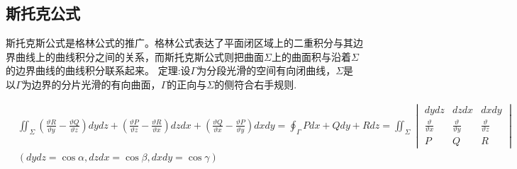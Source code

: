 \documentclass[10pt, a4paper, oneside]{ctexart}
\begin{document}
\begin{sloppypar}
	\subsection{斯托克公式}
	斯托克斯公式是格林公式的推广。格林公式表达了平面闭区域上的二重积分与其边界曲线上的曲线积分之间的关系，而斯托克斯公式则把曲面$\Sigma$上的曲面积与沿着$\Sigma$的边界曲线的曲线积分联系起来。
	定理:设$\Gamma$为分段光滑的空间有向闭曲线，$\Sigma$是以$\Gamma$为边界的分片光滑的有向曲面，$\Gamma$的正向与$\Sigma$的侧符合右手规则.

	\begin{equation}\label{斯托克公式}
		\begin{aligned}
			 & \iint_\Sigma (\frac{\vartheta R}{\vartheta y} - \frac{\vartheta Q}{\vartheta z})dydz +(\frac{\vartheta P}{\vartheta z} - \frac{\vartheta R}{\vartheta x})dzdx + (\frac{\vartheta Q}{\vartheta x} - \frac{\vartheta P}{\vartheta y})dxdy=\oint_\Gamma Pdx + Qdy + Rdz=\iint_\Sigma \begin{vmatrix}
				                                                                                                                                                                                                                                                                                     dydz                          & dzdx                          & dxdy                          \\
				                                                                                                                                                                                                                                                                                     \frac{\vartheta}{\vartheta x} & \frac{\vartheta}{\vartheta y} & \frac{\vartheta}{\vartheta z} \\
				                                                                                                                                                                                                                                                                                     P                             & Q                             & R
			                                                                                                                                                                                                                                                                                     \end{vmatrix} \\
			 & (dydz = \cos\alpha, dzdx = \cos\beta, dxdy = \cos\gamma)
		\end{aligned}
	\end{equation}


\end{sloppypar}
\end{document}
